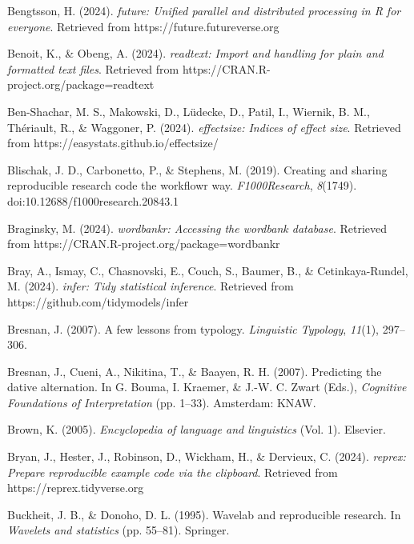 \documentclass[
  letterpaper,
  krantz1]{latex/krantz-mod}
\newlength{\cslhangindent}
\newenvironment{CSLReferences}[2] %
 {\begin{list}{}{%
  \setlength{\itemindent}{0pt}
  \setlength{\leftmargin}{0pt}
  \setlength{\parsep}{0pt}
  \ifodd #1
   \setlength{\leftmargin}{\cslhangindent}
   \setlength{\itemindent}{-1\cslhangindent}
  \fi
  \setlength{\itemsep}{#2\baselineskip}}}
 {\end{list}}
\theoremstyle{definition}
\theoremstyle{definition}
\theoremstyle{remark}
\begin{document}
\begin{CSLReferences}{1}{0}
Bengtsson, H. (2024). \emph{{future}: Unified parallel and distributed
processing in {R} for everyone}. Retrieved from
https://future.futureverse.org

Benoit, K., \& Obeng, A. (2024). \emph{{readtext}: Import and handling
for plain and formatted text files}. Retrieved from
https://CRAN.R-project.org/package=readtext

Ben-Shachar, M. S., Makowski, D., Lüdecke, D., Patil, I., Wiernik, B.
M., Thériault, R., \& Waggoner, P. (2024). \emph{{effectsize}: Indices
of effect size}. Retrieved from https://easystats.github.io/effectsize/

Blischak, J. D., Carbonetto, P., \& Stephens, M. (2019). Creating and
sharing reproducible research code the workflowr way.
\emph{F1000Research}, \emph{8}(1749). doi:10.12688/f1000research.20843.1

Braginsky, M. (2024). \emph{{wordbankr}: Accessing the wordbank
database}. Retrieved from https://CRAN.R-project.org/package=wordbankr

Bray, A., Ismay, C., Chasnovski, E., Couch, S., Baumer, B., \&
Cetinkaya-Rundel, M. (2024). \emph{{infer}: Tidy statistical inference}.
Retrieved from https://github.com/tidymodels/infer

Bresnan, J. (2007). A few lessons from typology. \emph{Linguistic
Typology}, \emph{11}(1), 297--306.

Bresnan, J., Cueni, A., Nikitina, T., \& Baayen, R. H. (2007).
Predicting the dative alternation. In G. Bouma, I. Kraemer, \& J.-W. C.
Zwart (Eds.), \emph{Cognitive {Foundations} of {Interpretation}} (pp.
1--33). Amsterdam: KNAW.

Brown, K. (2005). \emph{Encyclopedia of language and linguistics} (Vol.
1). Elsevier.

Bryan, J., Hester, J., Robinson, D., Wickham, H., \& Dervieux, C.
(2024). \emph{{reprex}: Prepare reproducible example code via the
clipboard}. Retrieved from https://reprex.tidyverse.org

Buckheit, J. B., \& Donoho, D. L. (1995). Wavelab and reproducible
research. In \emph{Wavelets and statistics} (pp. 55--81). Springer.


\end{CSLReferences}
\end{document}
